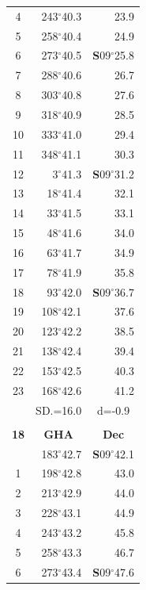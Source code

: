 \documentclass[10pt, a4paper]{report}
\begin{document}
\begin{scriptsize}
\begin{tabular*}{0.2\textwidth}[t]{@{\extracolsep{\fill}}|c|rr|}
4 & 243$^\circ$40.3 & 23.9\\
5 & 258$^\circ$40.4 & 24.9\\[2Pt]
6 & 273$^\circ$40.5 & \textbf{S}09$^\circ$25.8\\
7 & 288$^\circ$40.6 & 26.7\\
8 & 303$^\circ$40.8 & 27.6\\
9 & 318$^\circ$40.9 & \raisebox{0.24ex}{\boldmath$\cdot$~\boldmath$\cdot$~~}28.5\\
10 & 333$^\circ$41.0 & 29.4\\
11 & 348$^\circ$41.1 & 30.3\\[2Pt]
12 & 3$^\circ$41.3 & \textbf{S}09$^\circ$31.2\\
13 & 18$^\circ$41.4 & 32.1\\
14 & 33$^\circ$41.5 & 33.1\\
15 & 48$^\circ$41.6 & \raisebox{0.24ex}{\boldmath$\cdot$~\boldmath$\cdot$~~}34.0\\
16 & 63$^\circ$41.7 & 34.9\\
17 & 78$^\circ$41.9 & 35.8\\[2Pt]
18 & 93$^\circ$42.0 & \textbf{S}09$^\circ$36.7\\
19 & 108$^\circ$42.1 & 37.6\\
20 & 123$^\circ$42.2 & 38.5\\
21 & 138$^\circ$42.4 & \raisebox{0.24ex}{\boldmath$\cdot$~\boldmath$\cdot$~~}39.4\\
22 & 153$^\circ$42.5 & 40.3\\
23 & 168$^\circ$42.6 & 41.2\\
\hline
\rule{0pt}{2.4ex} & \multicolumn{1}{c}{SD.=16.0} & \multicolumn{1}{c|}{d=-0.9}\\
\hline
\multicolumn{1}{c}{}\\[-0.5ex]\hline
\multicolumn{1}{|c|}{\rule{0pt}{2.6ex}\textbf{18}} & \multicolumn{1}{c}{\textbf{GHA}} & \multicolumn{1}{c|}{\textbf{Dec}}\\
\hline\rule{0pt}{2.6ex}\noindent
0 & 183$^\circ$42.7 & \textbf{S}09$^\circ$42.1\\
1 & 198$^\circ$42.8 & 43.0\\
2 & 213$^\circ$42.9 & 44.0\\
3 & 228$^\circ$43.1 & \raisebox{0.24ex}{\boldmath$\cdot$~\boldmath$\cdot$~~}44.9\\
4 & 243$^\circ$43.2 & 45.8\\
5 & 258$^\circ$43.3 & 46.7\\[2Pt]
6 & 273$^\circ$43.4 & \textbf{S}09$^\circ$47.6\\

\end{tabular*}
\end{scriptsize}
\end{document}
